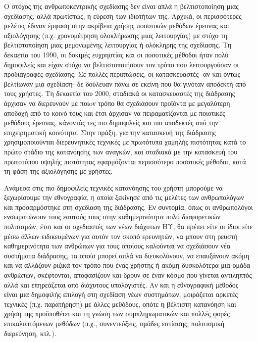 \documentclass[
]{article}
\begin{document}
Ο στόχος της ανθρωποκεντρικής σχεδίασης δεν είναι απλά η βελτιστοποίηση
μιας σχεδίασης, αλλά πρωτίστως, η εύρεση των ιδιοτήτων της. Αρχικά, οι
περισσότερες μελέτες έδιναν έμφαση στην ακρίβεια χρήσης ποσοτικών
μεθόδων έρευνας και αξιολόγησης (π.χ. χρονομέτρηση ολοκλήρωσης μιας
λειτουργίας) με στόχο τη βελτιστοποίηση μιας μεμονωμένης λειτουργίας ή
ολόκληρης της σχεδίασης. Τη δεκαετία του 1990, οι δοκιμές ευχρηστίας και
οι ποσοτικές μέθοδοι ήταν πολύ δημοφιλείς και είχαν στόχο να
βελτιστοποιήσουν τον τρόπο που λειτουργούσαν οι προδιαγραφές σχεδίασης.
Σε πολλές περιπτώσεις, οι κατασκευαστές -αν και όντως βελτίωναν μια
σχεδίαση- δε δούλευαν πάνω σε εκείνη που θα γινόταν αποδεκτή από τους
χρήστες. Τη δεκαετία του 2000, σταδιακά οι κατασκευαστές της διάδρασης
άρχισαν να διερευνούν με ποιoν τρόπο θα σχεδιάσουν προϊόντα με
μεγαλύτερη αποδοχή από το κοινό τους και έτσι άρχισαν να πειραματίζονται
με ποιοτικές μεθόδους έρευνας, κάνοντάς τες πιο δημοφιλείς και πιο
αποδεκτές από την επιχειρηματική κοινότητα. Στην πράξη, για την
κατασκευή της διάδρασης χρησιμοποιούνται διερευνητικές τεχνικές με
πρωτότυπα χαμηλής πιστότητας κατά το πρώτο στάδιο της κατανόησης των
αναγκών, και σταδιακά με την κατασκευή του πρωτοτύπου υψηλής πιστότητας
εφαρμόζονται περισσότερο ποσοτικές μέθοδοι, κατά τη φάση της αξιολόγησης
με χρήστες.

Ανάμεσα στις πιο δημοφιλείς τεχνικές κατανόησης του χρήστη μπορούμε να
ξεχωρίσουμε την εθνογραφία, η οποία ξεκίνησε από τις μελέτες των
ανθρωπολόγων και προσαρμόστηκε στη σχεδίαση της διάδρασης. Εν συντομία,
όπως οι ανθρωπολόγοι ενσωματώνουν τους εαυτούς τους στην καθημερινότητα
πολύ διαφορετικών πολιτισμών, έτσι και οι σχεδιαστές των νέων διάχυτων
ΗΥ, θα πρέπει είτε οι ίδιοι είτε μέσω άλλων ειδικευμένων για αυτόν τον
σκοπό ερευνητών, να μπουν στη ρευστή καθημερινότητα των ανθρώπων για
τους οποίους καλούνται να σχεδιάσουν νέα συστήματα διάδρασης, τα οποία
μπορεί απλά να διευκολύνουν, να επαυξάνουν ακόμη και να αλλάζουν ριζικά
τον τρόπο που ένας χρήστης ή ακόμη δυσκολότερα μια ομάδα ανθρώπων,
σκέφτονται, αποφασίζουν και δρουν σε έναν κόσμο που γίνεται αντιληπτός
αλλά και επηρεάζεται από διάχυτους υπολογιστές. Αν και η εθνογραφική
μέθοδος είναι μια δημοφιλής επιλογή στη σχεδίαση νέων συστημάτων,
μοιράζεται αρκετές τεχνικές (π.χ. παρατήρηση) με άλλες μεθόδους, οπότε η
βέλτιστη κατανόηση και χρήση της προϋποθέτει και τη γνώση των
συμπληρωματικών και πολλές φορές επικαλυπτόμενων μεθόδων (π.χ.,
συνεντεύξεις, ομάδες εστίασης, πολιτισμική διερεύνηση, κτλ.).
\end{document}
